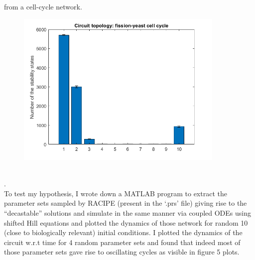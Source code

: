 \documentclass{article}
\begin{document}
from a cell-cycle network.
\begin{figure}[H]
  \centering
  \includegraphics[width=100mm, scale=0.5]{stability_states.png} \\
   \\
\end{figure}
.\\
To test my hypothesis, I wrote down a MATLAB program to extract the parameter 
sets sampled by RACIPE (present in the `.prs' file) giving rise to the 
``decastable'' solutions and simulate in the same manner via coupled ODEs 
using shifted Hill equations and plotted the dynamics of those network for 
random 10 (close to biologically relevant) initial conditions. I plotted 
the dynamics of the circuit w.r.t time for 4 random parameter sets and found that 
indeed most of those parameter sets gave rise to oscillating cycles as visible 
in figure 5 plots.  
\end{document}
